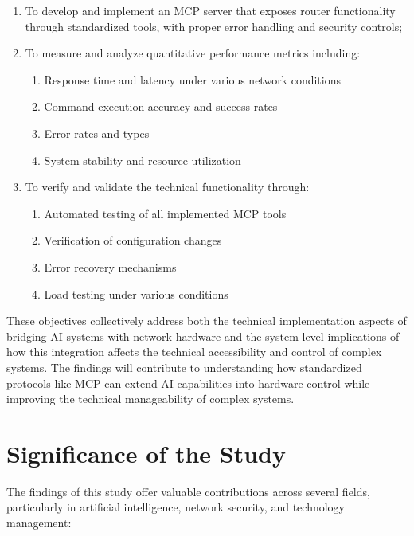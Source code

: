 \begin{enumerate}
\item To develop and implement an MCP server that exposes router functionality through standardized tools, with proper error handling and security controls;

\item To measure and analyze quantitative performance metrics including:
    \begin{enumerate}
        \item Response time and latency under various network conditions
        \item Command execution accuracy and success rates
        \item Error rates and types
        \item System stability and resource utilization
    \end{enumerate}

\item To verify and validate the technical functionality through:
    \begin{enumerate}
        \item Automated testing of all implemented MCP tools
        \item Verification of configuration changes
        \item Error recovery mechanisms
        \item Load testing under various conditions
    \end{enumerate}
\end{enumerate}

These objectives collectively address both the technical implementation aspects of bridging AI systems with network hardware and the system-level implications of how this integration affects the technical accessibility and control of complex systems. The findings will contribute to understanding how standardized protocols like MCP can extend AI capabilities into hardware control while improving the technical manageability of complex systems.

\section{Significance of the Study}

The findings of this study offer valuable contributions across several fields, particularly in artificial intelligence, network security, and technology management:

